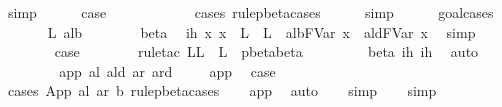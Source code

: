 \begin{isabellebody}
\ simp\isanewline
\ \ \ \ \isamarkupfalse%
\ {\isacharquery}case\ \isamarkupfalse%
\ {}\ \isanewline
\ \ \ \ \isamarkupfalse%
\ {}{\isacharparenleft}{}{\isacharparenright}\ \isamarkupfalse%
\ {\isacharparenleft}cases\ rule{\isacharcolon}pbeta{\isachardot}cases{\isacharparenright}\isanewline
\ \ \ \ \isamarkupfalse%
\ simp\isanewline
\ \ \ \ \isamarkupfalse%
\ goal{\isacharunderscore}cases\isanewline
\ \ \ \ \isamarkupfalse%
\ {\isacharparenleft}{}\ L{\isacharprime}\ alb{\isacharprime}{\isacharparenright}\isanewline
\ \ \ \ \ \ \isamarkupfalse%
\ beta\ \isamarkupfalse%
\ ih{}{\isacharcolon}\ {\isachardoublequoteopen}{\isasymAnd}x{\isachardot}\ x\ {\isasymnotin}\ L\ {\isasymunion}\ L{\isacharprime}\ {\isasymLongrightarrow}\ alb{\isacharprime}{\isacharcircum}FVar\ x\ {\isasymggreater}\ ald{\isacharcircum}FVar\ x{\isachardoublequoteclose}\ \isamarkupfalse%
\ simp\isanewline
\ \ \ \ \ \ \isamarkupfalse%
\ {\isacharquery}case\isanewline
\ \ \ \ \ \ \isamarkupfalse%
\ {\isacharparenleft}rule{\isacharunderscore}tac\ L{\isacharequal}{\isachardoublequoteopen}L\ {\isasymunion}\ L{\isacharprime}{\isachardoublequoteclose}\ \ pbeta{\isachardot}beta{\isacharparenright}\isanewline
\ \ \ \ \ \ \isamarkupfalse%
\ {}\ beta\ ih\ ih{}\ \isamarkupfalse%
\ auto\isanewline
\ \ \ \ \isamarkupfalse%
\isanewline
\ \ \isamarkupfalse%
\isanewline
{}\isamarkupfalse%
\isanewline
{}\isamarkupfalse%
\ {\isacharparenleft}app\ al\ ald\ ar\ ard{\isacharparenright}\ \isanewline
\ \ \isamarkupfalse%
\ app{\isacharparenleft}{}{\isacharcomma}{}{\isacharcomma}{}{\isacharparenright}\ \isamarkupfalse%
\ {\isacharquery}case\isanewline
\ \ \isamarkupfalse%
\ {\isacharparenleft}cases\ {\isachardoublequoteopen}App\ al\ ar{\isachardoublequoteclose}\ b\ rule{\isacharcolon}pbeta{\isachardot}cases{\isacharparenright}\isanewline
\ \ \isamarkupfalse%
\ app\ \isamarkupfalse%
\ auto{\isacharbrackleft}{}{\isacharbrackright}\isanewline
\ \ \isamarkupfalse%
\ simp\isanewline
\ \ \isamarkupfalse%
\ simp\isanewline
{}\isamarkupfalse%

\end{isabellebody}
